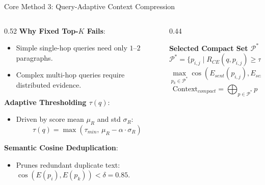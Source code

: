 \documentclass[10pt,aspectratio=169]{beamer}
\begin{document}
\begin{frame}{Core Method 3: Query-Adaptive Context Compression}
    \begin{columns}[onlytextwidth,T]
        \begin{column}{0.52\textwidth}
            \textbf{Why Fixed Top-$K$ Fails}:
            \begin{itemize}
                \item Simple single-hop queries need only $1$--$2$ paragraphs.
                \item Complex multi-hop queries require distributed evidence.
            \end{itemize}
            
            \vspace{0.15cm}
            \textbf{Adaptive Thresholding $\tau(q)$}:
            \begin{itemize}
                \item Driven by score mean $\mu_R$ and std $\sigma_R$:
                $$\tau(q) = \max(\tau_{min}, \, \mu_R - \alpha \cdot \sigma_R)$$
            \end{itemize}
            
            \textbf{Semantic Cosine Deduplication}:
            \begin{itemize}
                \item Prunes redundant duplicate text: $\cos(E(p_i), E(p_k)) < \delta = 0.85$.
            \end{itemize}
        \end{column}
        
        \begin{column}{0.44\textwidth}
            \begin{exampleblock}{\textbf{Selected Compact Set $\mathcal{P}^*$}}
                \footnotesize
                $$\mathcal{P}^* = \Big\{ p_{i,j} \;\Big|\; R_{CE}(q, p_{i,j}) \ge \tau(q) \;\land\;$$
                $$\max_{p_k \in \mathcal{P}^*} \cos(E_{sent}(p_{i,j}), E_{sent}(p_k)) < \delta \Big\}$$
                $$\text{Context}_{compact} = \bigoplus_{p \in \mathcal{P}^*} p$$
            \end{exampleblock}
        \end{column}
    \end{columns}
\end{frame}
\end{document}
